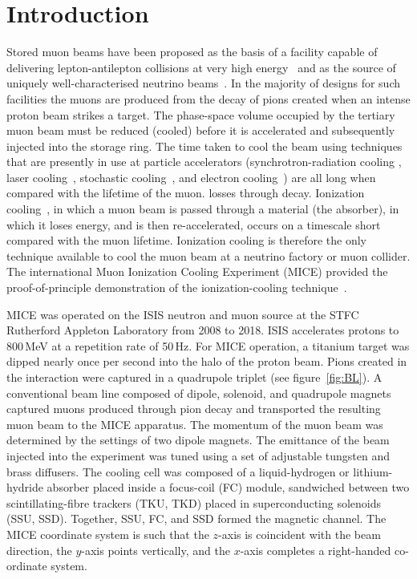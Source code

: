 \section{Introduction}
\label{Sect:Intro}

Stored muon beams have been proposed as the basis of a facility
capable of delivering lepton-antilepton collisions at very high
energy~\cite{Neuffer:1994bt,Palmer:2014nza} and as the source of
uniquely well-characterised neutrino 
beams~\cite{Geer:1998PhRvD..57.6989G,Bandyopadhyay:2007kx,Apollonio:2002en}.
In the majority of designs for such facilities the muons are produced
from the decay of pions created when an intense proton beam strikes a
target.
The phase-space volume occupied by the tertiary muon beam must be
reduced (cooled) before it is accelerated and subsequently injected
into the storage ring.
The time taken to cool the beam using techniques that are presently in
use at particle accelerators (synchrotron-radiation cooling
\cite{2012acph.book.....L}, laser
cooling~\cite{PhysRevLett.64.2901,PhysRevLett.67.1238,doi:10.1063/1.329218},
stochastic cooling~\cite{Marriner:2003mn}, and electron
cooling~\cite{1063-7869-43-5-R01}) are all long when compared with the
lifetime of the muon.
losses through decay.
Ionization cooling~\cite{cooling_methods,Neuffer:1983jr}, in which a
muon beam is passed through a material (the absorber), in which it
loses energy, and is then re-accelerated, occurs on a timescale short
compared with the muon lifetime.
Ionization cooling is therefore the only technique available to cool the muon beam at a neutrino factory or muon collider.
The international Muon Ionization Cooling Experiment (MICE)
provided the proof-of-principle demonstration of the
ionization-cooling technique~\cite{Bogomilov:2019kfj}.

MICE was operated on the ISIS neutron and muon source at the STFC
Rutherford Appleton Laboratory from 2008 to 2018.  
ISIS accelerates protons to 800\,MeV at a repetition rate of
50\,Hz.
For MICE operation, a titanium target was dipped nearly once per
second into the halo of the proton beam. 
Pions created in the interaction were captured in a quadrupole triplet
(see figure~\ref{fig:BL}).
A conventional beam line composed of dipole, solenoid, and quadrupole
magnets captured muons produced through pion decay and transported the
resulting muon beam to the MICE apparatus.
The momentum of the muon beam was determined by the settings of two
dipole magnets.
The emittance of the beam injected into the experiment was tuned using
a set of adjustable tungsten and brass diffusers.
The cooling cell was composed of a liquid-hydrogen or lithium-hydride
absorber placed inside a focus-coil (FC) module, sandwiched between
two scintillating-fibre trackers (TKU, TKD) placed in superconducting
solenoids (SSU, SSD).
Together, SSU, FC, and SSD formed the magnetic channel.
The MICE coordinate system is such that the $z$-axis is coincident
with the beam direction, the $y$-axis points vertically, and the
$x$-axis completes a right-handed co-ordinate system.

